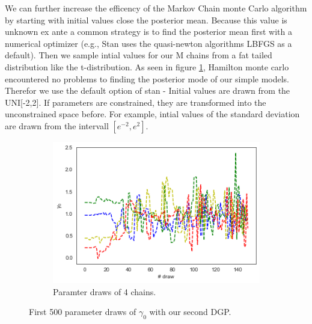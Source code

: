 
We can further increase the efficency of the Markov Chain monte Carlo algorithm by starting with initial values close the posterior mean. Because this value is unknown ex ante a common strategy is to find the posterior mean first with a numerical optimizer (e.g., Stan uses the quasi-newton algorithms LBFGS as a default). Then we sample intial values for our M chains from a fat tailed distribution like the t-distribution.\cite{brooks1998}
As seen in figure \ref{fig:convergence}, Hamilton monte carlo encountered no problems to finding the posterior mode of our simple models. Therefor we use the default option of stan - Initial values are drawn from the UNI[-2,2]. If parameters are constrained, they are transformed into the unconstrained space before. For example, intial values of the standard deviation are drawn from the intervall $[e^{-2},e^2]$.   

\begin{figure}[h!]
  \centering
  \begin{subfigure}{0.3\linewidth}
    \includegraphics[width=\linewidth]{graphics/convergence}
    \caption{Paramter draws of 4 chains.}
  \end{subfigure}
  \caption{First 500 parameter draws of $\gamma_0$ with our second DGP.}
  \label{fig:convergence}
\end{figure}

